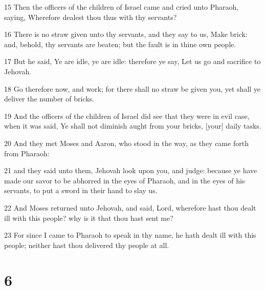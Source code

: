 \par 15 Then the officers of the children of Israel came and cried unto Pharaoh, saying, Wherefore dealest thou thus with thy servants?
\par 16 There is no straw given unto thy servants, and they say to us, Make brick: and, behold, thy servants are beaten; but the fault is in thine own people.
\par 17 But he said, Ye are idle, ye are idle: therefore ye say, Let us go and sacrifice to Jehovah.
\par 18 Go therefore now, and work; for there shall no straw be given you, yet shall ye deliver the number of bricks.
\par 19 And the officers of the children of Israel did see that they were in evil case, when it was said, Ye shall not diminish aught from your bricks, [your] daily tasks.
\par 20 And they met Moses and Aaron, who stood in the way, as they came forth from Pharaoh:
\par 21 and they said unto them, Jehovah look upon you, and judge: because ye have made our savor to be abhorred in the eyes of Pharaoh, and in the eyes of his servants, to put a sword in their hand to slay us.
\par 22 And Moses returned unto Jehovah, and said, Lord, wherefore hast thou dealt ill with this people? why is it that thou hast sent me?
\par 23 For since I came to Pharaoh to speak in thy name, he hath dealt ill with this people; neither hast thou delivered thy people at all.

\chapter{6}

